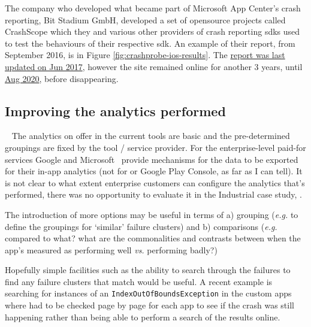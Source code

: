 The company who developed what became part of Microsoft App Center's crash reporting, Bit Stadium GmbH, %
developed a set of opensource projects called CrashScope which they and various other providers of crash reporting \Glspl{sdk} used to test the behaviours of their respective \Gls{sdk}. An example of their report, from  September 2016, is in Figure \ref{fig:crashprobe-ios-results}. The \href{https://github.com/bitstadium/crashprobe.github.com/commit/30844b9794f7cfd48f35d043f255b58f1f70e7e6}{report was last updated on  Jun 2017}, however the site remained online for another 3 years, until \href{https://github.com/bitstadium/crashprobe.github.com/commit/4398b88e263d222ed4d55e1dce59d67de11bfaaa}{ Aug 2020}, before disappearing. 
% 

\subsection{Improving the analytics performed}~\label{tats-improving-the-analytics-performed}
The analytics on offer in the current tools are basic and the pre-determined groupings are fixed by the tool / service provider. For the enterprise-level paid-for services Google and Microsoft~ provide mechanisms for the data to be exported for their in-app analytics (not for  or Google Play Console, as far as I can tell). It is not clear to what extent enterprise customers can configure the analytics that's performed, there was no opportunity to evaluate it in the Industrial case study, .

The introduction of more options may be useful in terms of a) grouping (\emph{e.g.} to define the groupings for `similar' failure clusters) and b) comparisons (\emph{e.g.} compared to what? what are the commonalities and contrasts between when the app's measured as performing well \emph{vs.} performing badly?)

Hopefully simple facilities such as the ability to search through the failures to find any failure clusters that match would be useful. A recent example is searching for instances of an \texttt{IndexOutOfBoundsException} in the  custom apps where  had to be checked page by page for each app to see if the crash was still happening rather than being able to perform a search of the results online.

